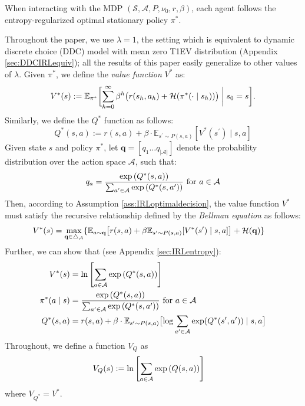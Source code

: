 \begin{asmp}\label{ass:IRLoptimaldecision} When interacting with the MDP $\left(\mathcal{S}, \mathcal{A}, P, \nu_0, r, \beta\right)$, each agent follows the entropy-regularized optimal stationary policy $\pi^*$.
\end{asmp}

\noindent Throughout the paper, we use $\lambda = 1$, the setting which is equivalent to dynamic discrete choice (DDC) model with mean zero T1EV distribution  (Appendix \ref{sec:DDCIRLequiv}); all the results of this paper easily generalize to other values of $\lambda$. Given $\pi^*$, we define the \textit{value function} $V^*$ as:
$$
V^*(s) := \mathbb{E}_{\pi^*} \biggl[\sum_{h=0}^\infty \beta^h 
\bigl(r(s_h, a_h) + \mathcal{H}(\pi^*(\cdot \mid s_h))\bigr) \biggm| s_0 = s\biggr].
$$
Similarly, we define the $Q^*$ function as follows:
$$Q^*(s, a):=r\left(s, a\right)+\beta \cdot \mathbb{E}_{s^\prime \sim P(s,a)}\left[{V}^*\left(s^\prime\right)\mid s, a\right]$$
Given state $s$ and policy $\pi^*$, let $\mathbf{q} = [q_1 \ldots q_{|\mathcal{A}|}]$ denote the probability distribution over the action space $\mathcal{A}$, such that:
\begin{align}  
    q_a= \frac{\exp \left({Q^*(s, a)}\right)}{\sum_{a^\prime\in \mathcal{A}} \exp \left({Q^*(s, a^\prime)}\right)} \text{ for } a\in \mathcal{A} \notag
\end{align}
Then, according to Assumption \ref{ass:IRLoptimaldecision}, the value function $V^*$ must satisfy the recursive relationship defined by the \textit{Bellman equation} as follows:
\begin{align}
&V^*(s)=\max_{\mathbf{q} \in \triangle_\mathcal{A}}\{
\mathbb{E}_{a\sim\mathbf{q}}\bigl[r(s, a) +\beta \mathbb{E}_{s^\prime\sim P(s,a)}[V^*(s^\prime)\mid s, a]\bigr] +\mathcal{H}(\mathbf{q})\} \notag
\end{align}
Further, we can show that (see Appendix \ref{sec:IRLentropy}):
\begin{align}
    V^*(s)&=\ln \left[\sum_{a\in \mathcal{A}}\exp\left(Q^*(s, a)\right)\right] \notag
    \\
    \pi^*(a\mid s) &= \frac{\exp \left({Q^*(s, a)}\right)}{\sum_{a^\prime\in \mathcal{A}} \exp \left({Q^*(s, a^\prime)}\right)} \text{ for } a\in \mathcal{A} \notag
    \\
     Q^\ast(s,a)&=r(s, a)+\beta \cdot \mathbb{E}_{s^\prime \sim P(s, a)}\bigl[\log\sum_{a^\prime\in\mathcal{A}}\exp(Q^*(s^\prime,a^\prime)) \mid s, a\bigr]\label{eq:QBellman}
\end{align}
Throughout, we define a function $V_Q$ as 
\begin{align}
    V_Q(s)&:=\ln \left[\sum_{a\in \mathcal{A}}\exp\left(Q(s, a)\right)\right] \notag
\end{align}
where $ V_{Q^\ast} = V^\ast$. 


